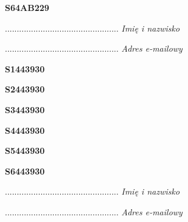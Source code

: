 \begin{turn}{90}\huge \textbf{S64AB229}\end{turn}

\begin{turn}{90}\begin{minipage}{\linewidth} \vspace{20mm} ................................................  \textit{Imię i nazwisko}\end{minipage}\end{turn}

\begin{turn}{90}\begin{minipage}{\linewidth} \vspace{20mm} ................................................  \textit{Adres e-mailowy}\end{minipage}\end{turn}

\begin{turn}{90}\huge \textbf{S1443930}\end{turn}

\begin{turn}{90}\huge \textbf{S2443930}\end{turn}

\begin{turn}{90}\huge \textbf{S3443930}\end{turn}

\begin{turn}{90}\huge \textbf{S4443930}\end{turn}

\begin{turn}{90}\huge \textbf{S5443930}\end{turn}

\begin{turn}{90}\huge \textbf{S6443930}\end{turn}

\begin{turn}{90}\begin{minipage}{\linewidth} \vspace{20mm} ................................................  \textit{Imię i nazwisko}\end{minipage}\end{turn}

\begin{turn}{90}\begin{minipage}{\linewidth} \vspace{20mm} ................................................  \textit{Adres e-mailowy}\end{minipage}\end{turn}

